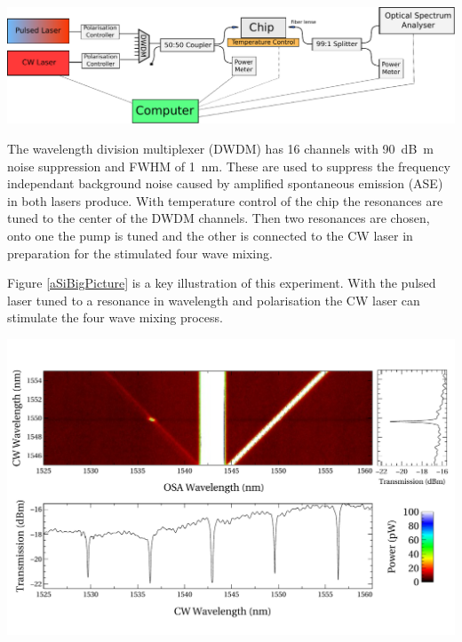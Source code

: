 \begingroup
    \centering  
    \includegraphics[width=18cm]{img/method/setup_1.pdf}
     \vspace{3pt} \label{simpleJSI}
\endgroup

The wavelength division multiplexer (DWDM) has 16 channels with \SI{90}{\deci\bel\m} noise suppression and FWHM of \SI{1}{\nano\m}. These are used to suppress the frequency independant background noise caused by amplified spontaneous emission (ASE) in both lasers produce. With temperature control of the chip the resonances are tuned to the center of the DWDM channels. Then two resonances are chosen, onto one the pump is tuned and the other is connected to the CW laser in preparation for the stimulated four wave mixing. 

Figure \ref{aSiBigPicture} is a key illustration of this experiment. With the pulsed laser tuned to a resonance in wavelength and polarisation the CW laser can stimulate the four wave mixing process. 

\begingroup
    \centering  
    \includegraphics[width=18cm]{img/method/aSiBigPicture.pdf}
     \vspace{3pt} \label{aSiBigPicture}
\endgroup

